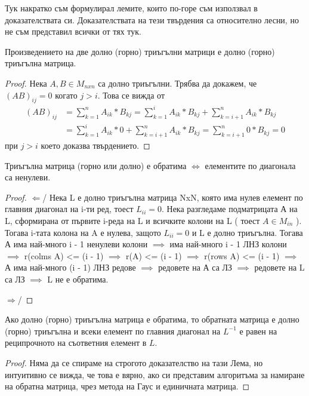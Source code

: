 \documentclass{article}
\begin{document}
Тук накратко съм формулирал лемите, които по-горе съм използвал в доказателствата си. Доказателствата на тези твърдения са относително лесни, но не съм представил всички от тях тук.
\begin{lemma}
Произведението на две долно (горно) триъгълни матрици е долно (горно) триъгълна матрица.
\end{lemma}
\begin{proof}
Нека $A, B \in M_{nxn}$ са долно триъгълни. Трябва да докажем, че $(AB)_{ij} = 0$ когато $j > i$. Това се вижда от
\begin{equation*}
\begin{split}
 (AB)_{ij} & = \sum_{k = 1}^{n} A_{ik} * B_{kj} = \sum_{k = 1}^{i} A_{ik} * B_{kj} + \sum_{k = i + 1}^{n} A_{ik} * B_{kj} \\ & = \sum_{k = 1}^{i} A_{ik} * 0 + \sum_{k = i + 1}^{n} A_{ik} * B_{kj} = \sum_{k = i + 1}^{n} 0 * B_{kj} = 0
\end{split}
\end{equation*}
при $j > i$ което доказва твърдението.
\end{proof}

\begin{lemma}
Триъгълна матрица (горно или долно) е обратима $\Leftrightarrow$ елементите по диагонала са ненулеви.
\end{lemma}
\begin{proof}
$\Leftarrow$/ Нека L е долно триъгълна матрица NxN, която има нулев елемент по главния диагонал на i-ти ред, тоест $L_{ii} = 0$. Нека разгледаме подматрицата А на L, сформирана от първите i-реда на L и всичките колони на L ( тоест $A \in M_{in}$ ). Тогава i-тата колона на A е нулева, защото $L_{ii} = 0$ и L е долно триъгълна. Тогава А има най-много i - 1 ненулеви колони $\implies$ има най-много i - 1 ЛНЗ колони $\implies$ r(colms A) <= (i - 1) $\implies$ r(A) <= (i - 1) $\implies$ r(rows A) <= (i - 1)  $\implies$ А има най-много (i - 1) ЛНЗ редове $\implies$ редовете на А са ЛЗ $\implies$ редовете на L са ЛЗ $\implies$ L не е обратима.

$\Rightarrow$/
\end{proof}

\begin{lemma}
Ако долно (горно) триъгълна матрица е обратима, то обратната матрица е долно (горно) триъгълна и всеки елемент по главния диагонал на $L^{-1}$ е равен на реципрочното на съответния елемент в $L$.  
\end{lemma}
\begin{proof}
Няма да се спираме на строгото доказателство на тази Лема, но интуитивно се вижда, че това е вярно, ако си представим алгоритъма за намиране на обратна матрица, чрез метода на Гаус и единичната матрица.
\end{proof}
\end{document}
